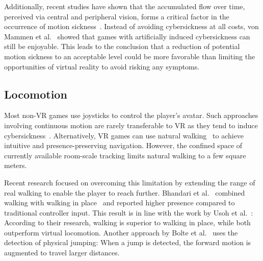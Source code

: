 \documentclass{sigchi}
\newcommand{\comm}[1]{}
\begin{document}
Additionally, recent studies have shown that the accumulated flow over time, perceived via central and peripheral vision, forms a critical factor in the occurrence of motion sickness~\cite{Lee:2017:ESS:3145690.3145697}. Instead of avoiding cybersickness at all costs, von Mammen et al.~\cite{von2016cyber} showed that games with artificially induced cybersickness can still be enjoyable. This leads to the conclusion that a reduction of potential motion sickness to an acceptable level could be more favorable than limiting the opportunities of virtual reality to avoid risking any symptoms.

\subsection{Locomotion}
Most non-VR games use joysticks to control the player's avatar. Such approaches involving continuous motion are rarely transferable to VR as they tend to induce cybersickness~\cite{Habgood:2017:HLP:3130859.3131437}. Alternatively, VR games can use natural walking~\cite{ruddle2009benefits} to achieve intuitive and presence-preserving navigation. However, the confined space of currently available room-scale tracking limits natural walking to a few square meters. \par
Recent research focused on overcoming this limitation by extending the range of real walking to enable the player to reach further. Bhandari et al.~\cite{ Bhandari:2017:LSW:3139131.3139133} combined walking with walking in place~\cite{slater1995taking, tregillus2016vr} and reported higher presence compared to traditional controller input. This result is in line with the work by Usoh et al.~\cite{usoh1999walking}: According to their research, walking is superior to walking in place, while both outperform virtual locomotion\comm{ techniques}. Another approach by Bolte et al.~\cite{bolte2011jumper} uses the detection of physical jumping: When \comm{an acceleration and }a jump is detected, the \comm{resulting }forward motion is augmented to travel larger distances.\par
\end{document}
